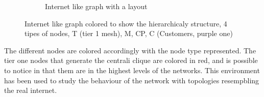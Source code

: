 \begin{figure}[h]
\begin{subfigure}[b]{0.45\textwidth}
		 \caption{Internet like graph with a  layout}
         \label{fig:internet_graph_hierarchical}
     \end{subfigure}
        \caption{Internet like graph colored to show the hierarchicaly structure,
4 tipes of nodes, T (tier 1 mesh), M, CP, C (Customers, purple one)}
        \label{fig:internet_graphs}
\end{figure}

The different nodes are colored accordingly with the node type represented.
The tier one nodes that generate the centrali clique are colored in red, and
is possible to notice in  that them are
in the highest levels of the networks.
This environment has been used to study the behaviour of the network with 
topologies resempbling the real internet.
